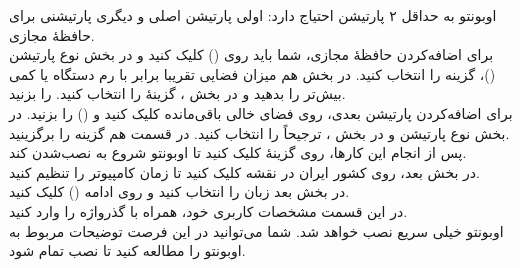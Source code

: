 اوبونتو به حداقل ۲ پارتیشن احتیاج دارد: اولی پارتیشن اصلی و دیگری پارتیشنی برای حافظهٔ مجازی.\\
برای اضافه‌کردن حافظهٔ مجازی، شما باید روی \lr{+} () کلیک کنید و در بخش نوع پارتیشن ()، گزینه  را انتخاب کنید. در بخش  هم میزان فضایی تقریبا برابر با رم دستگاه یا کمی بیش‌تر را بدهید و در بخش ، گزینهٔ  را انتخاب کنید.  را بزنید.\\
برای اضافه‌کردن پارتیشن بعدی، روی فضای خالی باقی‌مانده کلیک کنید و \lr{+} () را بزنید. در بخش نوع پارتیشن  و در بخش ، ترجیحاً  را انتخاب کنید. در قسمت  هم گزینه \lr{/} را برگزینید.\\
پس از انجام این کارها، روی گزینهٔ  کلیک کنید تا اوبونتو شروع به نصب‌شدن کند.\\
در بخش بعد، روی کشور ایران در نقشه کلیک کنید تا زمان کامپیوتر را تنظیم کنید.\\
در بخش بعد زبان  را انتخاب کنید و روی ادامه () کلیک کنید.\\
در این قسمت مشخصات کاربری خود، همراه با گذرواژه را وارد کنید.\\
اوبونتو خیلی سریع نصب خواهد شد. شما می‌توانید در این فرصت توضیحات مربوط به اوبونتو را مطالعه کنید تا نصب تمام شود.
